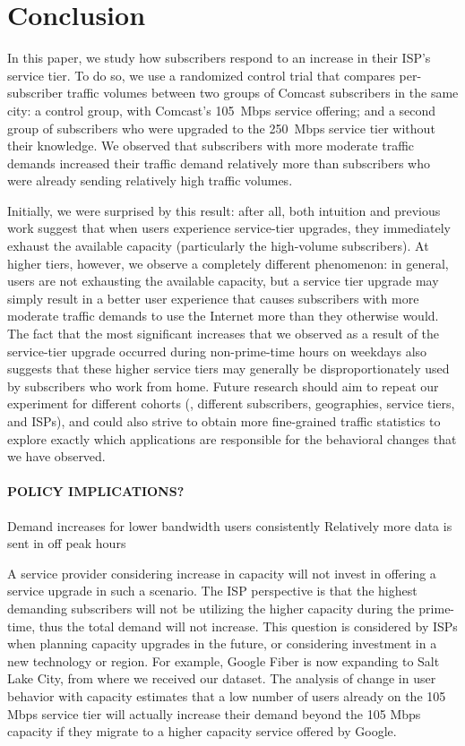\section{Conclusion}\label{sec:conclusion}

In this paper, we study how subscribers respond to an increase in their
ISP's service tier. To do so, we use a randomized control trial that compares
per-subscriber traffic volumes between two groups of Comcast subscribers
in the same city: a control group, with Comcast's 105~Mbps service
offering; and a second group of subscribers who were upgraded to the
250~Mbps service tier without their knowledge.  We observed that
subscribers with more moderate traffic demands increased their traffic
demand relatively more than subscribers who were already sending
relatively high traffic volumes.  

Initially, we were surprised by this result: after all, both intuition
and previous work suggest that when users experience service-tier
upgrades, they immediately exhaust the available capacity (particularly
the high-volume subscribers). At higher tiers, however, we observe a
completely different phenomenon: in general, users are not exhausting
the available capacity, but a service tier upgrade may simply result in
a better user experience that causes subscribers with more moderate
traffic demands to use the Internet more than they otherwise would.  The
fact that the most significant increases that we observed as a result of
the service-tier upgrade occurred during non-prime-time hours on
weekdays also suggests that these higher service tiers may generally be
disproportionately used by subscribers who work from home.  Future
research should aim to repeat our experiment for different cohorts (\ie,
different subscribers, geographies, service tiers, and ISPs), and could
also strive to obtain more fine-grained traffic statistics to explore
exactly which applications are responsible for the behavioral changes
that we have observed.


\paragraph{POLICY IMPLICATIONS?}

Demand increases for lower bandwidth users consistently
Relatively more data is sent in off peak hours 

A service provider considering increase in 
capacity will not invest in offering a service upgrade in such a scenario. The 
ISP perspective is that the highest demanding subscribers will not be utilizing 
the higher capacity during the prime-time, thus the total demand will not 
increase. This question is considered by ISPs when planning capacity upgrades 
in the future, or considering investment in a new technology or region. For 
example, Google Fiber is now expanding to Salt Lake City, from where 
we received our dataset. The analysis of change in user behavior with capacity 
estimates that a low number of users already on the 105 Mbps service tier will 
actually increase their demand beyond the 105 Mbps capacity if they 
migrate to a higher capacity service offered by Google. 

